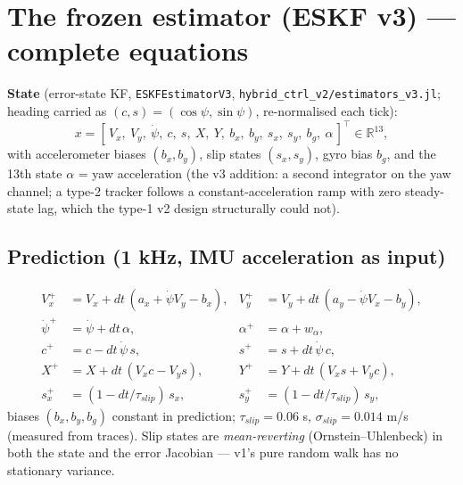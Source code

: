 \documentclass[11pt]{article}
\begin{document}
\section{The frozen estimator (ESKF v3) --- complete equations}
\label{app:eskf}

\textbf{State} (error-state KF, \texttt{ESKFEstimatorV3},
\texttt{hybrid\_ctrl\_v2/estimators\_v3.jl}; heading carried as $(c,s)=(\cos\psi,\sin\psi)$,
re-normalised each tick):
\begin{equation}
x = [\,V_x,\ V_y,\ \dot\psi,\ c,\ s,\ X,\ Y,\ b_x,\ b_y,\ s_x,\ s_y,\ b_g,\ \alpha\,]^\top \in \mathbb{R}^{13},
\end{equation}
with accelerometer biases $(b_x,b_y)$, slip states $(s_x,s_y)$, gyro bias $b_g$, and the
13th state $\alpha$ = yaw acceleration (the v3 addition: a second integrator on the yaw
channel; a type-2 tracker follows a constant-acceleration ramp with zero steady-state
lag, which the type-1 v2 design structurally could not).

\subsection{Prediction (1 kHz, IMU acceleration as input)}
\begin{align}
V_x^+ &= V_x + dt\,(a_x + \dot\psi V_y - b_x), &
V_y^+ &= V_y + dt\,(a_y - \dot\psi V_x - b_y),\\
\dot\psi^+ &= \dot\psi + dt\,\alpha, &
\alpha^+ &= \alpha + w_\alpha,\\
c^+ &= c - dt\,\dot\psi\,s, &
s^+ &= s + dt\,\dot\psi\,c,\\
X^+ &= X + dt\,(V_x c - V_y s), &
Y^+ &= Y + dt\,(V_x s + V_y c),\\
s_x^+ &= (1-dt/\tau_{slip})\,s_x, &
s_y^+ &= (1-dt/\tau_{slip})\,s_y,
\end{align}
biases $(b_x,b_y,b_g)$ constant in prediction; $\tau_{slip}=0.06$ s,
$\sigma_{slip}=0.014$ m/s (measured from traces). Slip states are
\emph{mean-reverting} (Ornstein--Uhlenbeck) in both the state and the error Jacobian ---
v1's pure random walk has no stationary variance.
\end{document}
